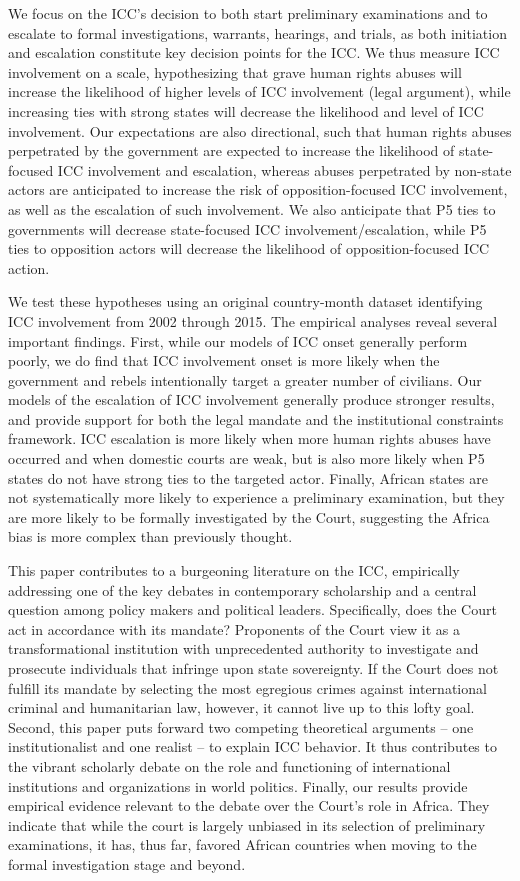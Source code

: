 We focus on the ICC’s decision to both start preliminary examinations and to escalate to formal investigations, warrants, hearings, and trials, as both initiation and escalation constitute key decision points for the ICC. We thus measure ICC involvement on a scale, hypothesizing that grave human rights abuses will increase the likelihood of higher levels of ICC involvement (legal argument), while increasing ties with strong states will decrease the likelihood and level of ICC involvement. Our expectations are also directional, such that human rights abuses perpetrated by the government are expected to increase the likelihood of state-focused ICC involvement and escalation, whereas abuses perpetrated by non-state actors are anticipated to increase the risk of opposition-focused ICC involvement, as well as the escalation of such involvement.  We also anticipate that P5 ties to governments will decrease state-focused ICC involvement/escalation, while P5 ties to opposition actors will decrease the likelihood of opposition-focused ICC action.

We test these hypotheses using an original country-month dataset identifying ICC involvement from 2002 through 2015.  The empirical analyses reveal several important findings. First, while our models of ICC onset generally perform poorly, we do find that ICC involvement onset is more likely when the government and rebels intentionally target a greater number of civilians. Our models of the escalation of ICC involvement generally produce stronger results, and provide support for both the legal mandate and the institutional constraints framework.  ICC escalation is more likely when more human rights abuses have occurred and when domestic courts are weak, but is also more likely when P5 states do not have strong ties to the targeted actor. Finally, African states are not systematically more likely to experience a preliminary examination, but they are more likely to be formally investigated by the Court, suggesting the Africa bias is more complex than previously thought. 

This paper contributes to a burgeoning literature on the ICC, empirically addressing one of the key debates in contemporary scholarship and a central question among policy makers and political leaders.  Specifically, does the Court act in accordance with its mandate? Proponents of the Court view it as a transformational institution with unprecedented authority to investigate and prosecute individuals that infringe upon state sovereignty. If the Court does not fulfill its mandate by selecting the most egregious crimes against international criminal and humanitarian law, however, it cannot live up to this lofty goal. Second, this paper puts forward two competing theoretical arguments – one institutionalist and one realist – to explain ICC behavior.  It thus contributes to the vibrant scholarly debate on the role and functioning of international institutions and organizations in world politics. Finally, our results provide empirical evidence relevant to the debate over the Court’s role in Africa.  They indicate that while the court is largely unbiased in its selection of preliminary examinations, it has, thus far, favored African countries when moving to the formal investigation stage and beyond.   

